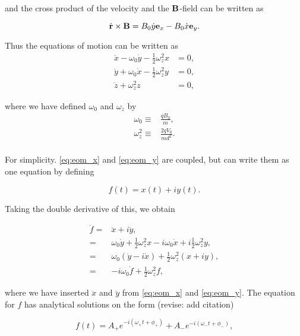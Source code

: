 and the cross product of the velocity and the $\bold{B}$-field can be written as

\begin{equation}
\dot{\bold{r}} \times \bold{B} = B_0 \dot{y} \bold{e}_x - B_0 \dot{x} \bold{e}_y.
\end{equation}

Thus the equations of motion can be written as
\begin{align}
      \ddot{x} - \omega_{0}\dot{y} - \frac{1}{2}\omega_{z}^{2}x &= 0, \label{eq:eom_x}\\
  \ddot{y} + \omega_{0}\dot{x} - \frac{1}{2}\omega_{z}^{2}y &= 0, \label{eq:eom_y}\\
  \ddot{z} + \omega_{z}^{2}z &= 0, \label{eq:eom_z}
\end{align}

where we have defined $\omega_0$ and $\omega_z$ by
\begin{align}
\omega_0 \equiv& \frac{qB_0}{m}, \label{eq:omega_0} \\
\omega_z^2 \equiv& \frac{2qV_0}{md^2}. \label{eq:omega_z} \\
\end{align}

For simplicity.
\autoref{eq:eom_x} and \autoref{eq:eom_y} are coupled, but can write them as one equation by defining

\begin{equation}
f(t) = x(t) + iy(t).
\end{equation}

Taking the double derivative of this, we obtain

\begin{align}
\ddot{f} =& \ddot{x} + i\ddot{y}, \\
=& \omega_0\dot{y} + \frac{1}{2}\omega_z^2x - i\omega_0\dot{x} + i\frac{1}{2}\omega_z^2y, \\
=& \omega_0\left(\dot{y} - i\dot{x}\right) + \frac{1}{2} \omega_z^2\left(x + iy\right), \\
=& -i\omega_0 \dot{f} + \frac{1}{2}\omega_z^2f,
\end{align}

where we have inserted $\ddot{x}$ and $\ddot{y}$ from \autoref{eq:eom_x} and \autoref{eq:eom_y}. The equation for $f$ has analytical solutions on the form (revise: add citation)

\begin{equation}
f(t) = A_+e^{-i(\omega_+t + \phi_+)} + A_-e^{-i(\omega_-t  + \phi_-)},
\label{eq:f_gen_sol}
\end{equation}


